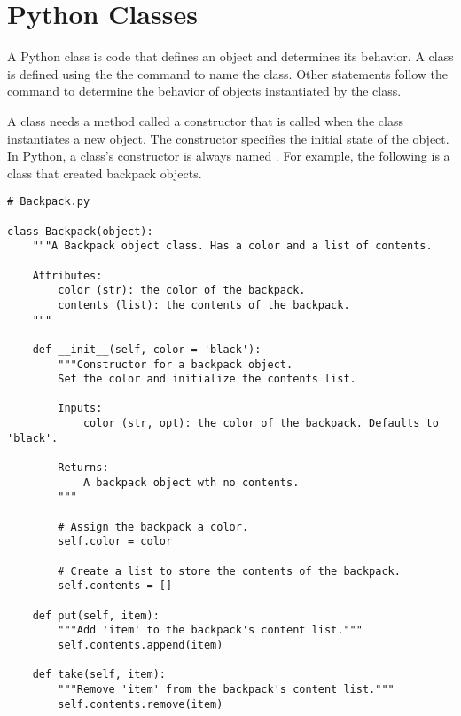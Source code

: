 \label{lab:OOP}

\section*{Python Classes}

A Python class is code that defines an object and determines its behavior.
A class is defined using the the  command to name the class.
Other statements follow the  command to determine the behavior of objects instantiated by the class.

A class needs a method called a constructor that is called when the class instantiates a new object.
The constructor specifies the initial state of the object.
In Python, a class's constructor is always named .
For example, the following is a class that created backpack objects.

\begin{lstlisting}
# Backpack.py

class Backpack(object):
    """A Backpack object class. Has a color and a list of contents.
    
    Attributes:
        color (str): the color of the backpack.
        contents (list): the contents of the backpack.
    """
    
    def __init__(self, color = 'black'):
        """Constructor for a backpack object.
		Set the color and initialize the contents list.
        
        Inputs:
            color (str, opt): the color of the backpack. Defaults to 'black'.
        
        Returns:
            A backpack object wth no contents.
        """
        
        # Assign the backpack a color.
        self.color = color
        
        # Create a list to store the contents of the backpack.
        self.contents = []
    
    def put(self, item):
        """Add 'item' to the backpack's content list."""
        self.contents.append(item)
    
    def take(self, item):
        """Remove 'item' from the backpack's content list."""
        self.contents.remove(item)
\end{lstlisting}

